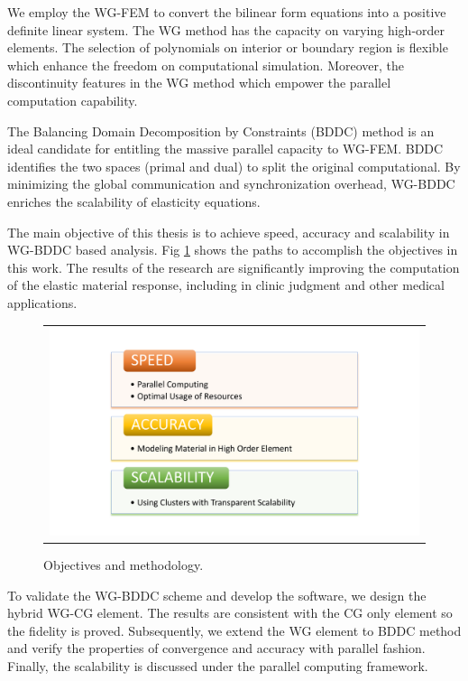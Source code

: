 We employ the WG-FEM to convert the bilinear form equations into a positive definite linear system. The WG method has the capacity on varying high-order elements. The selection of polynomials on interior or boundary region is flexible which enhance the freedom on computational simulation. Moreover, the discontinuity features in the WG method which empower the parallel computation capability.

The Balancing Domain Decomposition by Constraints (BDDC) method is an ideal candidate for entitling the massive parallel capacity to WG-FEM. BDDC identifies the two spaces (primal and dual) to split the original computational. By minimizing the global communication and synchronization overhead,  WG-BDDC enriches the scalability of elasticity equations.

The main objective of this thesis is to achieve speed, accuracy and scalability in WG-BDDC based analysis. Fig \ref{fig: ch1p4} shows the paths to accomplish the objectives in this work. The results of the research are significantly improving the computation of the elastic material response, including in clinic judgment and other medical applications.

\begin{figure}[H]
	\centering
	\begin{tabular}{c}
		\includegraphics[width=1.0\textwidth]{./pics/ch1p4}
	\end{tabular}
	\caption{\footnotesize Objectives and methodology.} \label{fig: ch1p4}
\end{figure}

To validate the WG-BDDC scheme and develop the software, we design the hybrid WG-CG element. The results are consistent with the CG only element so the fidelity is proved. Subsequently, we extend the WG element to BDDC method and verify the properties of convergence and accuracy with parallel fashion. Finally, the scalability is discussed under the parallel computing framework.

